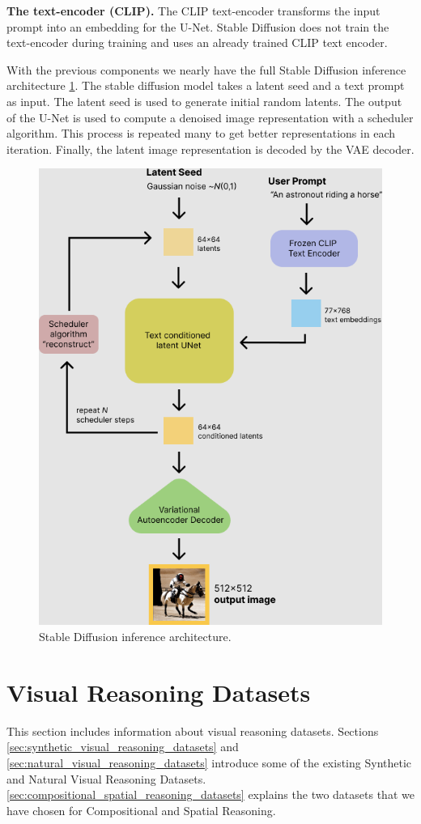 \textbf{The text-encoder (CLIP).} The CLIP \cite{radford2021clip} text-encoder transforms the input prompt into an embedding for the U-Net. Stable Diffusion does not train the text-encoder during training and uses an already trained CLIP text encoder.

With the previous components we nearly have the full Stable Diffusion inference architecture \cref{fig:stable_diffusion}. The stable diffusion model takes a latent seed and a text prompt as input. The latent seed is  used to generate initial random latents. The output of the U-Net is used to compute a denoised image representation with a scheduler algorithm. This process is repeated many to get better representations in each iteration. Finally, the latent image representation is decoded by the VAE decoder.

\begin{figure}[ht]
    \centering
    \includegraphics[width=0.6\linewidth]{images/diffusion/stable_diffusion.png}
    \caption{Stable Diffusion inference architecture.}
    \label{fig:stable_diffusion}
\end{figure}

\section{Visual Reasoning Datasets} \label{sec:visual_reasoning_datasets}

This section includes information about visual reasoning datasets. Sections \ref{sec:synthetic_visual_reasoning_datasets} and \ref{sec:natural_visual_reasoning_datasets} introduce some of the existing Synthetic and Natural Visual Reasoning Datasets. \cref{sec:compositional_spatial_reasoning_datasets} explains the two datasets that we have chosen for Compositional and Spatial Reasoning.

